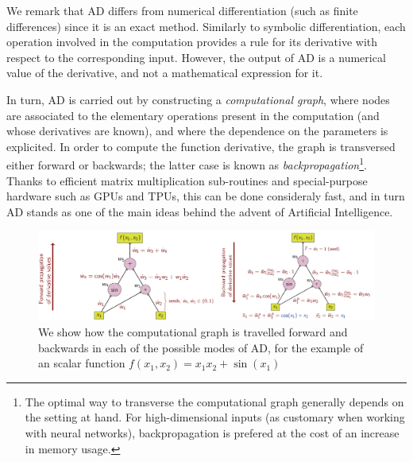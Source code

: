 We remark that AD differs from numerical differentiation (such as finite differences) since it is an exact method. Similarly to symbolic differentiation, each operation involved in the computation provides a rule for its derivative with respect to the corresponding input. However, the output of AD is a numerical value of the derivative, and not a mathematical expression for it.

In turn, AD is carried out by constructing a \textit{computational graph}, where nodes are associated to the elementary operations present in the computation (and whose derivatives are known), and where the dependence on the parameters is explicited. In order to compute the function derivative, the graph is transversed either forward or backwards; the latter case is known as \textit{backpropagation}\footnote{The optimal way to transverse the computational graph generally depends on the setting at hand. For high-dimensional inputs (as customary when working with neural networks), backpropagation is prefered at the cost of an increase in memory usage.}. Thanks to efficient matrix multiplication sub-routines and special-purpose hardware such as GPUs and TPUs, this can be done consideraly fast, and in turn AD stands as one of the main ideas behind the advent of Artificial Intelligence.

\begin{figure}[t!]
    \centering
    \includegraphics[width=1.\textwidth]{Figures/ad.pdf}
    \caption{We show how the computational graph is travelled forward and backwards in each of the possible modes of AD, for the example of an scalar function $f(x_1,x_2) = x_1 x_2 + \sin(x_1)$}
    \label{fig:ad}
\end{figure}

